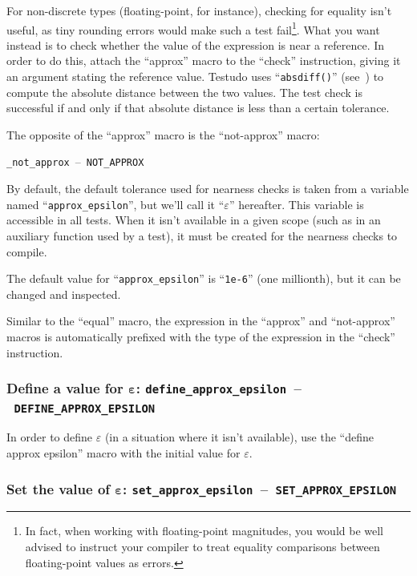 \documentclass[twoside, a4paper, article]{memoir}
\newcommand*\testudocolor{\color{red!80!blue}}
\newcommand*\testudo[1]{\texttt{\testudocolor{}#1}}
\newcommand*\testudopair[2]{\testudo{#1}~--~\testudo{#2}}
\newcommand\subsubsectiontestudopair[3]{%
  \subsubsection[#1]{#1: \testudopair{#2}{#3}}}
\providecommand\typesetexample[1]{%
}
\begin{document}
For non-discrete types (floating-point, for instance), checking for equality
isn't useful, as tiny rounding errors would make such a test fail\footnote{In
  fact, when working with floating-point magnitudes, you would be well advised
  to instruct your compiler to treat equality comparisons between
  floating-point values as errors.}.  What you want instead is to check whether
the value of the expression is near a reference.  In order to do this, attach
the ``approx'' macro to the ``check'' instruction, giving it an argument
stating the reference value.  Testudo uses ``\texttt{absdiff()}''
(see~) to compute the absolute distance
between the two values.  The test check is successful if and only if that
absolute distance is less than a certain tolerance.

\typesetexample{check-approx}

The opposite of the ``approx'' macro is the ``not-approx'' macro:
\begin{center}
  \testudopair{\_not\_approx}{NOT\_APPROX}
\end{center}

By default, the default tolerance used for nearness checks is taken from a
variable named ``\texttt{approx\_epsilon}'', but we'll call it
``$\varepsilon$'' hereafter.  This variable is accessible in all tests.  When
it isn't available in a given scope (such as in an auxiliary function used by a
test), it must be created for the nearness checks to compile.

The default value for ``\texttt{approx\_epsilon}'' is ``\texttt{1e-6}'' (one
millionth), but it can be changed and inspected.

Similar to the ``equal'' macro, the expression in the ``approx'' and
``not-approx'' macros is automatically prefixed with the type of the expression
in the ``check'' instruction.

\subsubsectiontestudopair{Define a value for $\bm{\varepsilon}$}%
  {define\_approx\_epsilon}{DEFINE\_APPROX\_EPSILON}
\label{sec:define-value-epsilon}

In order to define $\varepsilon$ (in a situation where it isn't available), use
the ``define approx epsilon'' macro with the initial value for $\varepsilon$.

\typesetexample{define-approx-epsilon}

\subsubsectiontestudopair{Set the value of $\bm{\varepsilon}$}%
  {set\_approx\_epsilon}{SET\_APPROX\_EPSILON}
\label{sec:set-value-epsilon}
\end{document}

